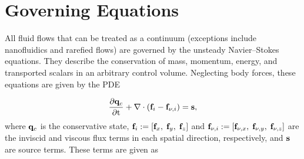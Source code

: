 \section{Governing Equations}

All fluid flows that can be treated as a continuum (exceptions include nanofluidics and rarefied flows) are governed by the unsteady Navier--Stokes equations. They describe the conservation of mass, momentum, energy, and transported scalars in an arbitrary control volume. Neglecting body forces, these equations are given by the PDE

\begin{equation}\label{eq:gemsGovPDE}
    \frac{\partial \mathbf{q}_c}{\partial \text{t}} + \nabla \cdot (\mathbf{f}_{i} - \mathbf{f}_{\nu,i}) = \mathbf{s},
\end{equation}
where $\mathbf{q}_c$ is the conservative state, $\mathbf{f}_{i} := [\mathbf{f}_x, \; \mathbf{f}_y, \; \mathbf{f}_z]$ and $\mathbf{f}_{\nu,i} := [\mathbf{f}_{\nu,x}, \; \mathbf{f}_{\nu,y}, \; \mathbf{f}_{\nu,z}]$ are the inviscid and viscous flux terms in each spatial direction, respectively, and $\mathbf{s}$ are source terms. These terms are given as

